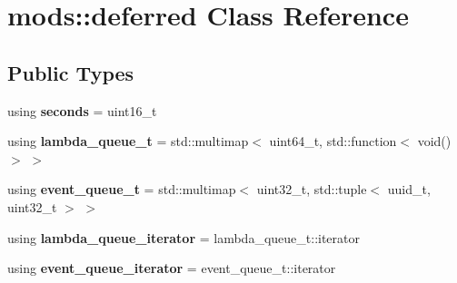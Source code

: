 \hypertarget{classmods_1_1deferred}{}\section{mods\+:\+:deferred Class Reference}
\label{classmods_1_1deferred}
\subsection*{Public Types}
\begin{DoxyCompactItemize}
\item 
\mbox{\label{classmods_1_1deferred_a60626d363466835d24f2552b8e137775}} 
using {\bfseries seconds} = uint16\+\_\+t
\item 
\mbox{\label{classmods_1_1deferred_a16af03a33122bebfd5e95dbaf7089697}} 
using {\bfseries lambda\+\_\+queue\+\_\+t} = std\+::multimap$<$ uint64\+\_\+t, std\+::function$<$ void()$>$ $>$
\item 
\mbox{\label{classmods_1_1deferred_afcd68c9bedceabeba46a29fa2914746c}} 
using {\bfseries event\+\_\+queue\+\_\+t} = std\+::multimap$<$ uint32\+\_\+t, std\+::tuple$<$ uuid\+\_\+t, uint32\+\_\+t $>$ $>$
\item 
\mbox{\label{classmods_1_1deferred_a720edc74344337fd2477db67eea12184}} 
using {\bfseries lambda\+\_\+queue\+\_\+iterator} = lambda\+\_\+queue\+\_\+t\+::iterator
\item 
\mbox{\label{classmods_1_1deferred_ab270f4e3c967e2abc8cc0c0a267a9ad0}} 
using {\bfseries event\+\_\+queue\+\_\+iterator} = event\+\_\+queue\+\_\+t\+::iterator
\end{DoxyCompactItemize}
